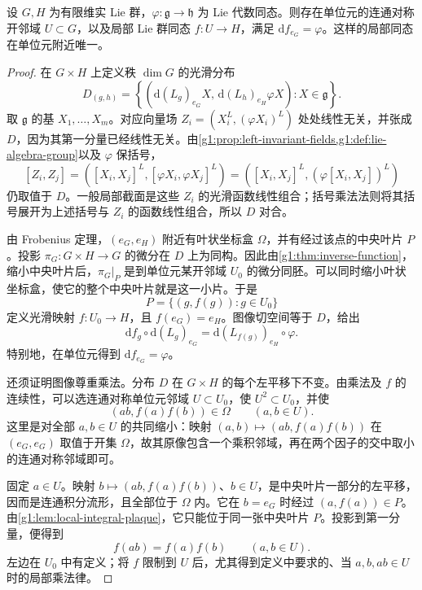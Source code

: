 \begin{theorem}
	\label{g1:thm:local-lie-homomorphism}
	设 \(G,H\) 为有限维实 Lie 群，\(\varphi:\mathfrak g\to\mathfrak h\) 为 Lie 代数同态。则存在单位元的连通对称开邻域 \(U\subset G\)，以及局部 Lie 群同态 \(f:U\to H\)，满足 \(\mathrm{d}f_{e_G}=\varphi\)。这样的局部同态在单位元附近唯一。
\end{theorem}
\begin{proof}
	在 \(G\times H\) 上定义秩 \(\dim G\) 的光滑分布
	\begin{equation}
		\label{g1:eq:homomorphism-graph-distribution}
		D_{(g,h)}
		=\left\{\left(\mathrm{d}(L_g)_{e_G}X,\,
		\mathrm{d}(L_h)_{e_H}\varphi X\right):X\in\mathfrak g\right\}.
	\end{equation}
	取 \(\mathfrak g\) 的基 \(X_1,\ldots,X_m\)。对应向量场
	\(Z_i=(X_i^L,(\varphi X_i)^L)\)
	处处线性无关，并张成 \(D\)，因为其第一分量已经线性无关。由\cref{g1:prop:left-invariant-fields,g1:def:lie-algebra-group}以及 \(\varphi\) 保括号，
	\[
		[Z_i,Z_j]
		=\left([X_i,X_j]^L,[\varphi X_i,\varphi X_j]^L\right)
		=\left([X_i,X_j]^L,(\varphi[X_i,X_j])^L\right)
	\]
	仍取值于 \(D\)。一般局部截面是这些 \(Z_i\) 的光滑函数线性组合；括号乘法法则将其括号展开为上述括号与 \(Z_i\) 的函数线性组合，所以 \(D\) 对合。

	由 Frobenius 定理，\((e_G,e_H)\) 附近有叶状坐标盒 \(\Omega\)，并有经过该点的中央叶片 \(P\)。投影 \(\pi_G:G\times H\to G\) 的微分在 \(D\) 上为同构。因此由\cref{g1:thm:inverse-function}，缩小中央叶片后，\(\pi_G|_P\) 是到单位元某开邻域 \(U_0\) 的微分同胚。可以同时缩小叶状坐标盒，使它的整个中央叶片就是这一小片。于是
	\[
		P=\{(g,f(g)):g\in U_0\}
	\]
	定义光滑映射 \(f:U_0\to H\)，且 \(f(e_G)=e_H\)。图像切空间等于 \(D\)，给出
	\begin{equation}
		\label{g1:eq:local-homomorphism-differential}
		\mathrm{d}f_g\circ\mathrm{d}(L_g)_{e_G}
		=\mathrm{d}(L_{f(g)})_{e_H}\circ\varphi.
	\end{equation}
	特别地，在单位元得到 \(\mathrm{d}f_{e_G}=\varphi\)。

	还须证明图像尊重乘法。分布 \(D\) 在 \(G\times H\) 的每个左平移下不变。由乘法及 \(f\) 的连续性，可以选连通对称单位元邻域 \(U\subset U_0\)，使 \(U^2\subset U_0\)，并使
	\[
		(ab,f(a)f(b))\in\Omega\qquad(a,b\in U).
	\]
	这里是对全部 \(a,b\in U\) 的共同缩小：映射 \((a,b)\mapsto(ab,f(a)f(b))\) 在 \((e_G,e_G)\) 取值于开集 \(\Omega\)，故其原像包含一个乘积邻域，再在两个因子的交中取小的连通对称邻域即可。

	固定 \(a\in U\)。映射 \(b\mapsto(ab,f(a)f(b))\)、\(b\in U\)，是中央叶片一部分的左平移，因而是连通积分流形，且全部位于 \(\Omega\) 内。它在 \(b=e_G\) 时经过 \((a,f(a))\in P\)。由\cref{g1:lem:local-integral-plaque}，它只能位于同一张中央叶片 \(P\)。投影到第一分量，便得到
	\[
		f(ab)=f(a)f(b)\qquad(a,b\in U).
	\]
	左边在 \(U_0\) 中有定义；将 \(f\) 限制到 \(U\) 后，尤其得到定义中要求的、当 \(a,b,ab\in U\) 时的局部乘法律。


\end{proof}
